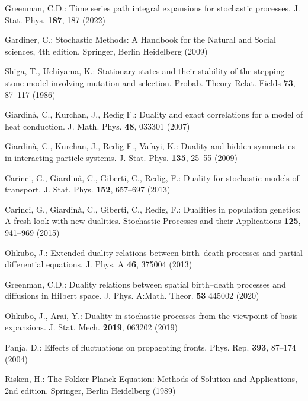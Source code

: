 \documentclass[sn-mathphys,Numbered]{sn-jnl}%
\theoremstyle{thmstyleone}%
\theoremstyle{thmstyletwo}%
\theoremstyle{thmstylethree}%
\begin{document}
\begin{thebibliography}{99}
Greenman, C.D.:
Time series path integral expansions for stochastic processes.
J. Stat. Phys. \textbf{187}, 187 (2022)



Gardiner, C.:
Stochastic Methods: A Handbook for the Natural and Social sciences, 4th edition.
Springer, Berlin Heidelberg (2009)



Shiga, T., Uchiyama, K.: 
Stationary states and their stability of the stepping stone model involving mutation and selection.
Probab. Theory Relat. Fields \textbf{73}, 87--117 (1986)

Giardin{\`a}, C., Kurchan, J., Redig F.:
Duality and exact correlations for a model of heat conduction.
J. Math. Phys. \textbf{48}, 033301 (2007)


Giardin{\`a}, C., Kurchan, J., Redig F., Vafayi, K.:
Duality and hidden symmetries in interacting particle systems.
J. Stat. Phys. \textbf{135}, 25--55 (2009)


Carinci, G., Giardin{\`a}, C., Giberti, C., Redig, F.:
Duality for stochastic models of transport.
J. Stat. Phys. \textbf{152}, 657--697 (2013)

Carinci, G., Giardin{\`a}, C., Giberti, C., Redig, F.:
Dualities in population genetics: A fresh look with new dualities.
Stochastic Processes and their Applications \textbf{125}, 941--969 (2015)


Ohkubo, J.:
Extended duality relations between birth–death processes and partial differential equations.
J. Phys. A \textbf{46}, 375004 (2013)

Greenman, C.D.:
Duality relations between spatial birth–death processes and diffusions in Hilbert space.
J. Phys. A:Math. Theor. \textbf{53} 445002 (2020) 



Ohkubo, J., Arai, Y.:
Duality in stochastic processes from the viewpoint of basis expansions.
J. Stat. Mech. \textbf{2019}, 063202 (2019) 


Panja, D.:
Effects of fluctuations on propagating fronts.
Phys. Rep. \textbf{393}, 87--174 (2004)



Risken, H.:
The Fokker-Planck Equation: Methods of Solution and Applications, 2nd edition.
Springer, Berlin Heidelberg (1989)



\end{thebibliography}
\end{document}
